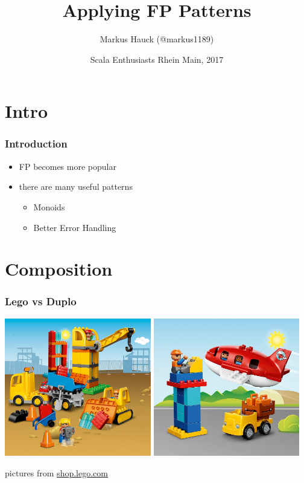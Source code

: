 \documentclass{beamer}
\title{Applying FP Patterns}
\author{Markus Hauck (@markus1189)}
\date{Scala Enthusiasts Rhein Main, 2017}
\begin{document}
\frame{\titlepage}

\section{Intro}
\label{sec:intro}

\begin{frame}
  \frametitle{Introduction}
  \begin{itemize}
  \item FP becomes more popular
  \item there are many useful patterns
    \begin{itemize}
    \item Monoids
    \item Better Error Handling
    \end{itemize}
  \end{itemize}
\end{frame}

\section{Composition}

\begin{frame}
  \frametitle{Lego vs Duplo}
  \begin{center}
    \includegraphics[width=0.48\textwidth]{../images/duplo-construction.jpg}
    \hspace{1mm}
    \includegraphics[width=0.48\textwidth]{../images/duplo-airport.jpg}
  \end{center}
  \vfill
  \begin{center}
    {\tiny pictures from \url{shop.lego.com}}
  \end{center}
\end{frame}
\end{document}

